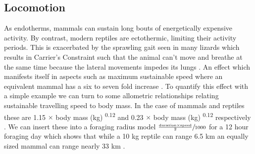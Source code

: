 \documentclass[a4paper,12pt]{article}
\begin{document}


\subsection*{Locomotion}
As endotherms, mammals can sustain long bouts of energetically expensive activity. 
By contrast, modern reptiles are ectothermic, limiting their activity periods.
This is exacerbated by the sprawling gait seen in many lizards which results in Carrier's Constraint such that the animal can't move and breathe at the same time because the lateral movements impedes its lungs \citep{carrier1987evolution}.
An effect which manifests itself in aspects such as maximum sustainable speed where an equivalent mammal has a six to seven fold increase \citep{ruben1995evolution}.
To quantify this effect with a simple example we can turn to some allometric relationships relating sustainable travelling speed to body mass.
In the case of mammals and reptiles these are 1.15 $\times$ body mass (kg) \textsuperscript{0.12} and 0.23 $\times$ body mass (kg) \textsuperscript{0.12} respectively \citep{ruxton2004obligate}.
We can insert these into a foraging radius model $\sfrac{\frac{\text{duration} \times \text{speed}}{2}}{1000}$ for a 12 hour foraging day which shows that while a 10 kg reptile can range 6.5 km an equally sized mammal can range nearly 33 km \citep{Enstipp2006Energetics}. 
\end{document}

